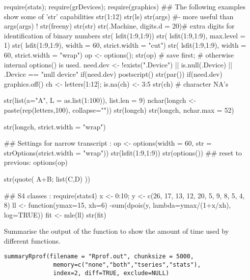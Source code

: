\begin{Examples}
\begin{ExampleCode}
require(stats); require(grDevices); require(graphics)
## The following examples show some of 'str' capabilities
str(1:12)
str(ls)
str(args) #- more useful than  args(args) !
str(freeny)
str(str)
str(.Machine, digits.d = 20)# extra digits for identification of binary numbers
str( lsfit(1:9,1:9))
str( lsfit(1:9,1:9), max.level = 1)
str( lsfit(1:9,1:9), width = 60, strict.width = "cut")
str( lsfit(1:9,1:9), width = 60, strict.width = "wrap")
op <- options(); str(op) # save first;
                         # otherwise internal options() is used.
need.dev <-
  !exists(".Device") || is.null(.Device) || .Device == "null device"
{ if(need.dev) postscript()
  str(par())
  if(need.dev) graphics.off()
}
ch <- letters[1:12]; is.na(ch) <- 3:5
str(ch) # character NA's

str(list(a="A", L = as.list(1:100)), list.len = 9)
nchar(longch <- paste(rep(letters,100), collapse=""))
str(longch)
str(longch, nchar.max = 52)

str(longch, strict.width = "wrap")

## Settings for narrow transcript :
op <- options(width = 60,
              str = strOptions(strict.width = "wrap"))
str(lsfit(1:9,1:9))
str(options())
## reset to previous:
options(op)



str(quote( { A+B; list(C,D) } ))



## S4 classes :
require(stats4)
x <- 0:10; y <- c(26, 17, 13, 12, 20, 5, 9, 8, 5, 4, 8)
ll <- function(ymax=15, xh=6)
      -sum(dpois(y, lambda=ymax/(1+x/xh), log=TRUE))
fit <- mle(ll)
str(fit)

\end{ExampleCode}
\end{Examples}
%
\begin{Description}\relax
Summarise the output of the  function to show the
amount of time used by different \R{} functions.
\end{Description}
%
\begin{Usage}
\begin{verbatim}
summaryRprof(filename = "Rprof.out", chunksize = 5000,
              memory=c("none","both","tseries","stats"),
              index=2, diff=TRUE, exclude=NULL)
\end{verbatim}
\end{Usage}
